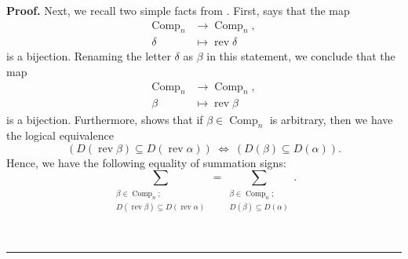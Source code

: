 \documentclass[numbers=enddot,12pt,final,onecolumn,notitlepage]{scrartcl}%
\theoremstyle{definition}
\newenvironment{proof}[1][Proof]{\noindent\textbf{#1.} }{\ \rule{0.5em}{0.5em}}
\let\sumnonlimits\sum
\renewcommand{\sum}{\sumnonlimits\limits}
\newenvironment{verlong}{}{}
\begin{document}
\begin{verlong}
\begin{proof}
Next, we recall two simple facts from \cite{comps}. First, \cite[Corollary
3.10]{comps} says that the map%
\begin{align*}
\operatorname*{Comp}\nolimits_{n}  &  \rightarrow\operatorname*{Comp}%
\nolimits_{n},\\
\delta &  \mapsto\operatorname*{rev}\delta
\end{align*}
is a bijection. Renaming the letter $\delta$ as $\beta$ in this statement, we
conclude that the map%
\begin{align*}
\operatorname*{Comp}\nolimits_{n}  &  \rightarrow\operatorname*{Comp}%
\nolimits_{n},\\
\beta &  \mapsto\operatorname*{rev}\beta
\end{align*}
is a bijection. Furthermore, \cite[Proposition 3.11]{comps} shows that if
$\beta\in\operatorname*{Comp}\nolimits_{n}$ is arbitrary, then we have the
logical equivalence%
\[
\left(  D\left(  \operatorname*{rev}\beta\right)  \subseteq D\left(
\operatorname*{rev}\alpha\right)  \right)  \ \Longleftrightarrow\ \left(
D\left(  \beta\right)  \subseteq D\left(  \alpha\right)  \right)  .
\]
Hence, we have the following equality of summation signs:%
\begin{equation}
\sum_{\substack{\beta\in\operatorname*{Comp}\nolimits_{n};\\D\left(
\operatorname*{rev}\beta\right)  \subseteq D\left(  \operatorname*{rev}%
\alpha\right)  }}=\sum_{\substack{\beta\in\operatorname*{Comp}\nolimits_{n}%
;\\D\left(  \beta\right)  \subseteq D\left(  \alpha\right)  }}.
\label{pf.lem.eta.S2rev.equivsum}%
\end{equation}



\end{proof}
\end{verlong}
\end{document}
